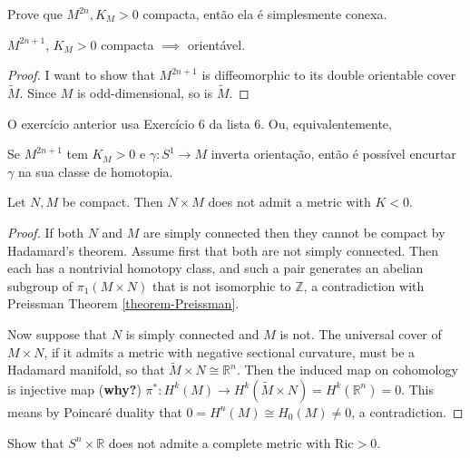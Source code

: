 \documentclass{book}
\begin{document}
\begin{exercise}
\label{exercise-even-dimen-posit-k-compa}
Prove que $M^{2n},K_M>0$ compacta, então ela
é simplesmente conexa.
\end{exercise}

\begin{exercise}
\label{exercise-odd-dimen-posit-k-orien}
$M^{2n+1}$, $K_M>0$ compacta $\implies$
orientável.
\end{exercise}

\begin{proof}
I want to show that $M^{2n+1}$ is
diffeomorphic to its double orientable cover
 $\tilde{M}$. Since $M$ is odd-dimensional,
 so is $\tilde{M}$.
\end{proof}

O exercício anterior usa Exercício 6 da lista
6. Ou, equivalentemente,

\begin{exercise}
\label{exercise-inver-orien-short}
Se $M^{2n+1}$ tem $K_M >0$ e $\gamma:S^1 \to
M$ inverta orientação, então é
possível encurtar $\gamma$ na sua classe de
homotopia.
\end{exercise}

\begin{exercise}
\label{exercise-produ-compa-does-not-admit}
Let $N,M$ be compact. Then $N \times M$ does
not admit a metric with $K<0$.
\end{exercise}

\begin{proof}
If both $N$ and $M$ are simply connected then
they cannot be compact by
Hadamard's theorem. Assume first that both
are not simply connected. Then each
has a nontrivial homotopy class, and such a
pair generates an abelian subgroup
of $\pi_1(M \times N)$ that is not isomorphic
to $\mathbb{Z}$, a contradiction
with Preissman Theorem
\ref{theorem-Preissman}.

Now suppose that $N$ is simply connected and
$M$ is not. The universal cover of
$M\times N$, if it admits a metric with
negative sectional curvature,
must be a Hadamard manifold, so that
$\tilde{M} \times N \cong \mathbb{R}^n$.
Then the induced map on cohomology is
injective map ({\bf why?})
$\pi^* :H^{k}(M)\to H^{k}(\tilde{M} \times
N)=H^{k}(\mathbb{R}^n)=0$. This means
by Poincaré duality that $0=H^{n}(M)\cong
H_0(M)\neq 0$, a contradiction.
\end{proof}

\begin{exercise}
\label{exercise-SnxR-no-positive-Ric}
Show that $S^n \times \mathbb{R}$ does not
admite a complete metric with
$\text{Ric}>0$.
\end{exercise}
\end{document}
